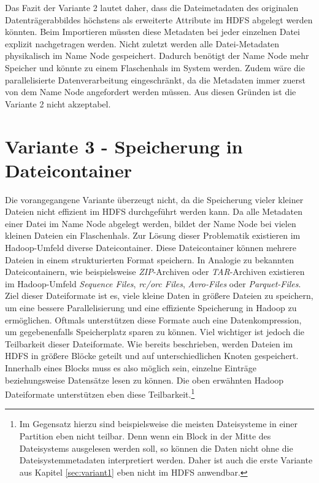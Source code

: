 \noindent
Das Fazit der Variante 2 lautet daher, dass die Dateimetadaten des originalen Datenträgerabbildes höchstens als erweiterte Attribute im HDFS abgelegt werden könnten. Beim Importieren müssten diese Metadaten bei jeder einzelnen Datei explizit nachgetragen werden. Nicht zuletzt werden alle Datei-Metadaten physikalisch im Name Node gespeichert. Dadurch benötigt der Name Node mehr Speicher und könnte zu einem Flaschenhals im System werden. Zudem wäre die parallelisierte Datenverarbeitung eingeschränkt, da die Metadaten immer zuerst von dem Name Node angefordert werden müssen. Aus diesen Gründen ist die Variante 2 nicht akzeptabel. 

\section{Variante 3 - Speicherung in Dateicontainer}

Die vorangegangene Variante überzeugt nicht, da die Speicherung vieler kleiner Dateien nicht effizient im HDFS durchgeführt werden kann. Da alle Metadaten einer Datei im Name Node abgelegt werden, bildet der Name Node bei vielen kleinen Dateien ein Flaschenhals. Zur Lösung dieser Problematik existieren im Hadoop-Umfeld diverse Dateicontainer. 
Diese Dateicontainer können mehrere Dateien in einem strukturierten Format speichern. In Analogie zu bekannten Dateicontainern, wie beispielsweise \textit{ZIP}-Archiven oder \textit{TAR}-Archiven existieren im Hadoop-Umfeld \textit{Sequence Files}, \textit{\acrshort{rc}/\acrshort{orc} Files}, \textit{Avro-Files} oder \textit{Parquet-Files}.\cite[S. 296]{expert_hadoop_admin} \\
Ziel dieser Dateiformate ist es, viele kleine Daten in größere Dateien zu speichern, um eine bessere Parallelisierung und eine effiziente Speicherung in Hadoop zu ermöglichen. Oftmals unterstützen diese Formate auch eine Datenkompression, um gegebenenfalls Speicherplatz sparen zu können. Viel wichtiger ist jedoch die Teilbarkeit dieser Dateiformate. Wie bereits beschrieben, werden Dateien im HDFS in größere Blöcke geteilt und auf unterschiedlichen Knoten gespeichert. 
Innerhalb eines Blocks muss es also möglich sein, einzelne Einträge beziehungsweise Datensätze lesen zu können. Die oben erwähnten Hadoop Dateiformate unterstützen eben diese Teilbarkeit.\footnote{Im Gegensatz hierzu sind beispielsweise die meisten Dateisysteme in einer Partition eben nicht teilbar. Denn wenn ein Block in der Mitte des Dateisystems ausgelesen werden soll, so können die Daten nicht ohne die Dateisystemmetadaten interpretiert werden. Daher ist auch die erste Variante aus Kapitel \ref{sec:variant1} eben nicht im HDFS anwendbar.}\\

